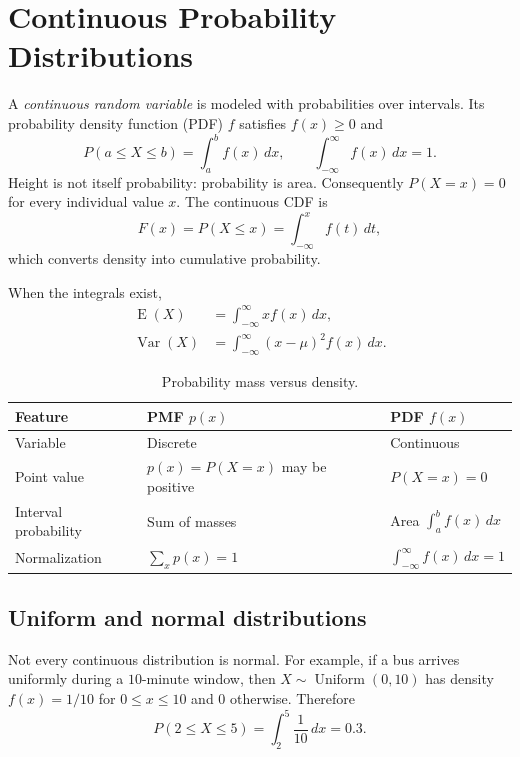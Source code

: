 \documentclass[11pt]{article}
\newcommand{\E}{\operatorname{E}}
\newcommand{\Var}{\operatorname{Var}}
\begin{document}
\section{Continuous Probability Distributions}\label{sec:continuous}
A \emph{continuous random variable} is modeled with probabilities over
intervals.  Its probability density function (PDF) $f$ satisfies $f(x)\ge0$
and
\begin{equation}\label{eq:density}
P(a\le X\le b)=\int_a^b f(x)\,dx,
\qquad \int_{-\infty}^{\infty}f(x)\,dx=1.
\end{equation}
Height is not itself probability: probability is area.  Consequently
$P(X=x)=0$ for every individual value $x$.  The continuous CDF is
\begin{equation}\label{eq:cont-cdf}
F(x)=P(X\le x)=\int_{-\infty}^{x}f(t)\,dt,
\end{equation}
which converts density into cumulative probability.

When the integrals exist,
\begin{align}
\E(X)&=\int_{-\infty}^{\infty}x f(x)\,dx,\label{eq:cont-mean}\\
\Var(X)&=\int_{-\infty}^{\infty}(x-\mu)^2 f(x)\,dx.\label{eq:cont-var}
\end{align}

\begin{table}[ht]
\centering
\caption{Probability mass versus density.}
\begin{tabularx}{\textwidth}{@{}lYY@{}}
\toprule
Feature & PMF $p(x)$ & PDF $f(x)$ \\
\midrule
Variable & Discrete & Continuous \\
Point value & $p(x)=P(X=x)$ may be positive & $P(X=x)=0$ \\
Interval probability & Sum of masses & Area $\int_a^b f(x)\,dx$ \\
Normalization & $\sum_xp(x)=1$ & $\int_{-\infty}^{\infty}f(x)\,dx=1$ \\
\bottomrule
\end{tabularx}
\end{table}

\subsection{Uniform and normal distributions}
Not every continuous distribution is normal.  For example, if a bus arrives
uniformly during a $10$-minute window, then $X\sim\operatorname{Uniform}(0,10)$
has density $f(x)=1/10$ for $0\le x\le10$ and $0$ otherwise.  Therefore
\[
P(2\le X\le5)=\int_2^5\frac{1}{10}\,dx=0.3.
\]
\end{document}
